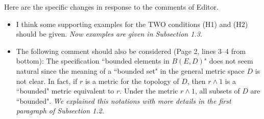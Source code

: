 \documentclass[12pt,a4paper]{amsart}
\begin{document}
	Here are the specific changes in response to the comments of Editor.
\begin{itemize}
	\item
	I think some supporting examples for the TWO conditions (H1) and (H2) should be given.
	{\it Now examples are given in Subsection 1.3.}
\\
	\item
	The following comment should also be considered (Page 2, lines 3--4 from bottom): The specification
``bounded elements in $B(E,D)$"
does not seem natural since the meaning of a
``bounded set"
in the general metric space $D$ is not clear. In fact, if $r$ is a metric for the topology of $D$, then $r\land 1$ is a
``bounded"
metric equivalent to $r$.
	Under the metric $r\land 1$, all subsets of $D$ are
``bounded".	
	{\it We explained this notations with more details in the first paragraph of Subsection 1.2.}
\end{itemize}
\end{document}
